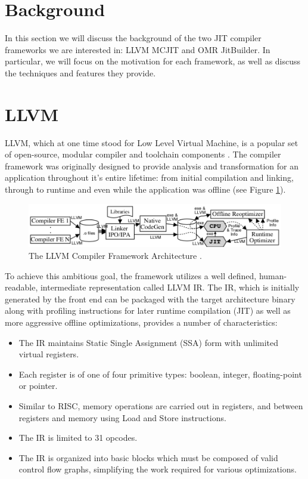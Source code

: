 \section{Background}
In this section we will discuss the background of the two JIT compiler frameworks we are interested in: LLVM MCJIT and OMR JitBuilder.
In particular, we will focus on the motivation for each framework, as well as discuss the techniques and features they provide.
\section{LLVM}
\label{sec:llvm}
LLVM, which at one time stood for Low Level Virtual Machine, is a popular set of open-source, modular compiler and toolchain components \cite{lattner2004llvm}.
The compiler framework was originally designed to provide analysis and transformation for an application throughout it's entire lifetime: from initial compilation and linking, through to runtime and even while the application was offline (see Figure \ref{fig:llvmarch}).
\begin{figure}
    \includegraphics[width=\textwidth]{images/llvm-architecture.png}
    \caption{ The LLVM Compiler Framework Architecture \cite{lattner2004llvm}.}
    \label{fig:llvmarch}
    \Description[]{}
\end{figure}
To achieve this ambitious goal, the framework utilizes a well defined, human-readable, intermediate representation called LLVM IR.
The IR, which is initially generated by the front end can be packaged with the target architecture binary along with profiling instructions for later runtime compilation (JIT) as well as more aggressive offline optimizations, provides a number of characteristics:
\begin{itemize}
    \item The IR maintains Static Single Assignment (SSA) form with unlimited virtual registers.
    \item Each register is of one of four primitive types: boolean, integer, floating-point or pointer.
    \item Similar to RISC, memory operations are carried out in registers, and between registers and memory using Load and Store instructions.
    \item The IR is limited to 31 opcodes.
    \item The IR is organized into basic blocks which must be composed of valid control flow graphs, simplifying the work required for various optimizations. 
\end{itemize}

